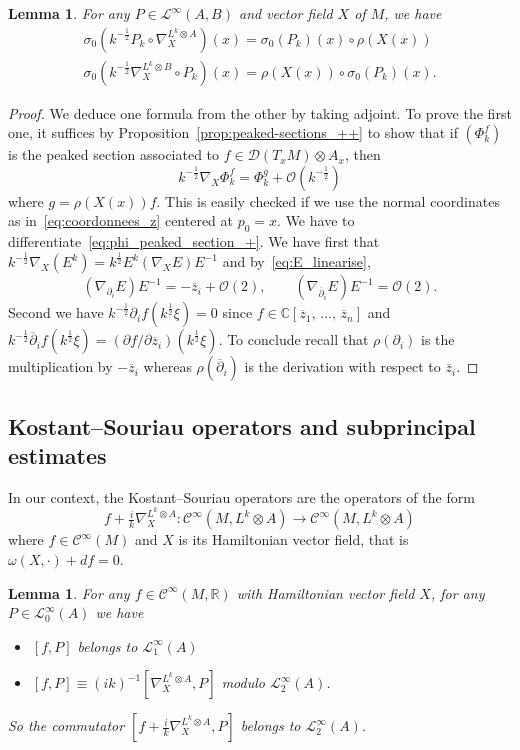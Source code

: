 \documentclass[10pt,a4paper]{article}
\newtheorem{lemm}[theo]{Lemma}
\theoremstyle{definition}
\numberwithin{equation}{section}
\newcommand{\R}{{\mathbb{R}}}
\newcommand{\C}{{\mathbb{C}}}
\newcommand{\si}{{\sigma}}
\newcommand{\om}{{\omega}}
\newcommand{\con}{\overline}
\newcommand{\Ci}{{\mathcal{C}}^{\infty}}
\newcommand{\bigo}{\mathcal{O}}
\newcommand{\D}{\mathcal{D}}
\newcommand{\lag}{\mathcal{L}}
\begin{document}
\begin{lemm}\label{lem:symb_der}
For any $P \in \lag^{\infty}(A,B)$ and vector field $X$ of $M$, we have
\begin{gather*}
\si_0 \left(k^{-\frac{1}{2}} P_k \circ \nabla^{L^k
\otimes A}_X\right) (x) = \si_0 (P_k) (x) \circ \rho (X(x)) \\
 \si_0 \left(k^{-\frac{1}{2}} \nabla^{L^k
\otimes B}_X \circ P_k\right) (x) = \rho (X(x)) \circ \si_0 (P_k) (x). 
\end{gather*}
\end{lemm}

\begin{proof}
We deduce one formula from the other by taking adjoint. To
prove the first one, it suffices by Proposition~\ref{prop:peaked-sections_++} to show that if $(\Phi_k^f)$ is the peaked section associated to $ f\in \D(T_xM) \otimes A_x$, then
\[
k^{-\frac{1}{2}}
\nabla_X \Phi_k^f = \Phi_k^g + \bigo \left(k^{-\frac{1}{2}}\right)
\]
where $g = \rho (X(x)) f $. This is easily checked if we use the normal coordinates as in~\eqref{eq:coordonnees_z} centered at $p_0 = x$. We have to differentiate~\eqref{eq:phi_peaked_section_+}. We have first that $k^{-\frac{1}{2}} \nabla_X (E^k) = k^{\frac{1}{2}} E^k (\nabla_X
E)E^{-1}$ and by~\eqref{eq:E_linearise},
\[
(\nabla_{\partial_i} E)E^{-1} =
- \con{z}_i + \bigo (2), \qquad (\nabla_{\con{\partial}_i} E)E^{-1} =
\bigo (2).
\]
Second we have $ k^{-\frac{1}{2}} \partial_i f (k^{\frac{1}{2}} \xi) = 0$ since $f \in \C [\con{z}_1, \,\ldots,\, \con{z}_n]$ and $ k^{-\frac{1}{2}} \con{\partial}_i f (k^{\frac{1}{2}} \xi) = (\partial f / \partial \con{z}_i) (k^{\frac{1}{2}} \xi)$. To conclude recall that $\rho (\partial_i) $ is the multiplication by $-\con{z}_i$ whereas $\rho (\con{\partial}_i)$ is the derivation with respect to $\con{z}_i$.
\end{proof}

\subsection{Kostant--Souriau operators and subprincipal estimates}

In our context, the Kostant--Souriau operators are the operators of the form
\[
f + \tfrac{i}{k} \nabla_X^{L^k \otimes A} : \Ci \left(M, L^k \otimes A\right)
\rightarrow \Ci \left(M, L^k \otimes A\right)
\]
where $ f \in \Ci (M)$ and $X$ is its
Hamiltonian vector field, that is $\om (X, \cdot) + df =0$.

\begin{lemm}\label{lem:ledernier}
For any $f \in \Ci (M, \R)$ with Hamiltonian vector field $X$, for any $P \in \lag^{\infty}_0 (A)$ we have
\begin{itemize}
\item $ [f, P]$ belongs to $\lag_{1}^{\infty} (A)$
\item $[f,P] \equiv (ik)^{-1} [\nabla_X^{L^k
\otimes A}, P]$ modulo $\lag_{2}^{\infty} (A)$.
\end{itemize}
So the commutator $[f +\frac{i}{k} \nabla_X^{L^k \otimes A}, P]$ belongs to $\lag_{2}^{\infty}(A)$.
\end{lemm}
\end{document}
